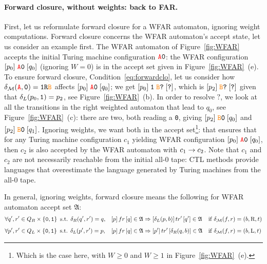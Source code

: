 \paragraph{Forward closure, without weights: back to FAR.} First, let us reformulate forward closure for a WFAR automaton, ignoring weight computations. Forward closure concerns the WFAR automaton's accept state, let us consider an example first. The WFAR automaton of Figure~\ref{fig:WFAR} accepts the initial Turing machine configuration $\texttt{\stateA}\szero$: the WFAR configuration $[p_0] \; \texttt{\stateA}\szero\; [q_0]$ (ignoring $W=0$) is in the accept set given in Figure~\ref{fig:WFAR}~(e). To ensure forward closure, Condition~\ref{eq:forwardclo}, let us consider how $\delta_\mathcal{M}(\texttt{\stateA},\szero) = \texttt{1R\stateB}$ affects $[p_0] \; \texttt{\stateA}\szero\; [q_0]$; we get $[p_0] \; \texttt{1}\; \texttt{\stateB}\texttt{?}\; [\texttt{?}]$, which is $[p_2] \; \texttt{\stateB}\texttt{?}\; [\texttt{?}]$ given that $\delta_L(p_0,\texttt{1}) = p_2$, see Figure~\ref{fig:WFAR}~(b). In order to resolve $\texttt{?}$, we look at all the transitions in the right weighted automaton that lead to $q_0$, see Figure~\ref{fig:WFAR}~(c): there are two, both reading a \texttt{0}, giving $[p_2] \; \texttt{\stateB}\texttt{0}\; [q_0]$ and $[p_2] \; \texttt{\stateB}\texttt{0}\; [q_1]$. Ignoring weights, we want both in the accept set\footnote{Which is the case here, with $W\geq 0$ and $W \geq 1$ in Figure~\ref{fig:WFAR}~(e).}: that ensures that for any Turing machine configuration $c_1$ yielding WFAR configuration $[p_0] \; \texttt{\stateA}\szero\; [q_0]$, then $c_2$ is also accepted by the WFAR automaton with $c_1 \to c_2$. Note that $c_1$ and $c_2$ are not necessarily reachable from the initial all-0 tape: CTL methods provide languages that overestimate the language generated by Turing machines from the all-0 tape.

In general, ignoring weights, forward closure means the following for WFAR automaton accept set $\mathfrak{A}$:
\begin{align}
     & \forall q', r' \in Q_R \times \left\{\texttt{0},\texttt{1}\right\} \text{ s.t. } \delta_R(q', r') = q,
     &                                                                              & [p]\, fr\, [q] \in \mathfrak{A} \Rightarrow [\delta_L(p,b)]\, tr'\, [q'] \in \mathfrak{A}
     &                                                                              & \text{if } \delta_{\mathcal{M}}(f,r) = (b, \text{R}, t) \label{eq:forwardcloR}
    \\[0.5em]
     & \forall p', r' \in Q_L\times \left\{\texttt{0},\texttt{1}\right\} \text{ s.t. } \delta_L(p', r') = p,
     &                                                                              & [p]\, fr\, [q] \in \mathfrak{A} \Rightarrow [p']\, tr'\, [\delta_R(q,b)] \in \mathfrak{A}
     &                                                                              & \text{if } \delta_{\mathcal{M}}(f,r) = (b, \text{L}, t) \label{eq:forwardcloL}
\end{align}

